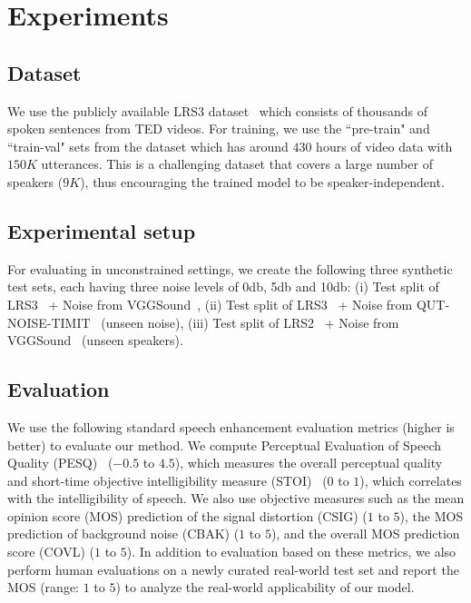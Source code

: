 \documentclass[10pt,twocolumn,letterpaper]{article}
\begin{document}
 

\section{Experiments}
\label{section:experiments} 


\subsection{Dataset}
We use the publicly available LRS3 dataset~\cite{Afouras18d} which consists of thousands of spoken sentences from TED videos. For training, we use the ``pre-train" and ``train-val" sets from the dataset which has around $430$ hours of video data with $150K$ utterances. This is a challenging dataset that covers a large number of speakers ($9K$), thus encouraging the trained model to be speaker-independent.

\subsection{Experimental setup}
\label{setup}
For evaluating in unconstrained settings, we create the following three synthetic test sets, each having three noise levels of 0db, 5db and 10db: (i) Test split of LRS3~\cite{Afouras18d} + Noise from VGGSound~\cite{9053174}, (ii) Test split of LRS3~\cite{Afouras18d} + Noise from QUT-NOISE-TIMIT~\cite{Dean2010TheQC} (unseen noise), (iii) Test split of LRS2~\cite{Afouras18c} + Noise from VGGSound~\cite{9053174} (unseen speakers). 

\subsection{Evaluation}
\label{subsection:test_sets}
We use the following standard speech enhancement evaluation metrics (higher is better) to evaluate our method. We compute Perceptual Evaluation of Speech Quality (PESQ)~\cite{rix2001perceptual} ($-0.5$ to $4.5$), which measures the overall perceptual quality and short-time objective intelligibility measure (STOI)~\cite{taal2010short} ($0$ to $1$), which correlates with the intelligibility of speech. We also use objective measures such as the mean opinion score (MOS) prediction of the signal distortion (CSIG) ($1$ to $5$), the MOS prediction of background noise (CBAK) ($1$ to $5$), and the overall MOS prediction score (COVL) ($1$ to $5$). In addition to evaluation based on these metrics, we also perform human evaluations on a newly curated real-world test set and report the MOS (range: $1$ to $5$) to analyze the real-world applicability of our model.
\end{document}
